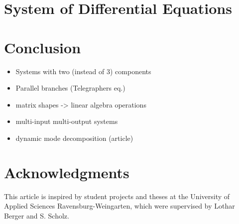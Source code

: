 \documentclass[a4paper, nobib,justified]{tufte-handout}
\begin{document}
% 	
% 	
	

	
	
	\section{System of Differential Equations}
	
	
	

	

	\section{Conclusion}
	\begin{itemize}
		\item Systems with two (instead of 3) components
		\item Parallel branches (Telegraphers eq.)
		\item matrix shapes -> linear algebra operations
		\item multi-input multi-output systems
		\item dynamic mode decomposition (article)
	\end{itemize}


	\section*{Acknowledgments}	
	This article is inspired by student projects and theses at the University of Applied Sciences Ravensburg-Weingarten, which were supervised by Lothar Berger and S. Scholz.
\end{document}
